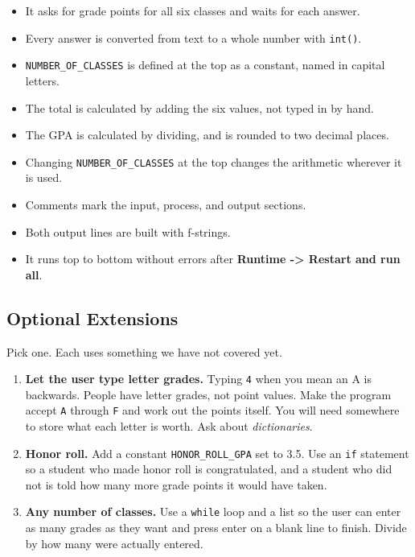 \documentclass[11pt]{article}
\begin{document}
\begin{itemize}
\item[{$\square$}] It asks for grade points for all six classes and waits for each answer.\\
\item[{$\square$}] Every answer is converted from text to a whole number with \texttt{int()}.\\
\item[{$\square$}] \texttt{NUMBER\_OF\_CLASSES} is defined at the top as a constant, named in capital letters.\\
\item[{$\square$}] The total is calculated by adding the six values, not typed in by hand.\\
\item[{$\square$}] The GPA is calculated by dividing, and is rounded to two decimal places.\\
\item[{$\square$}] Changing \texttt{NUMBER\_OF\_CLASSES} at the top changes the arithmetic wherever it is used.\\
\item[{$\square$}] Comments mark the input, process, and output sections.\\
\item[{$\square$}] Both output lines are built with f-strings.\\
\item[{$\square$}] It runs top to bottom without errors after \textbf{Runtime -> Restart and run all}.\\
\end{itemize}
\subsection{Optional Extensions}
\label{sec:org04ab082}

Pick one. Each uses something we have not covered yet.\\

\begin{enumerate}
\item \textbf{Let the user type letter grades.} Typing \texttt{4} when you mean an A is backwards. People have letter grades, not point values. Make the program accept \texttt{A} through \texttt{F} and work out the points itself. You will need somewhere to store what each letter is worth. Ask about \emph{dictionaries}.\\
\item \textbf{Honor roll.} Add a constant \texttt{HONOR\_ROLL\_GPA} set to 3.5. Use an \texttt{if} statement so a student who made honor roll is congratulated, and a student who did not is told how many more grade points it would have taken.\\
\item \textbf{Any number of classes.} Use a \texttt{while} loop and a list so the user can enter as many grades as they want and press enter on a blank line to finish. Divide by how many were actually entered.\\
\end{enumerate}
\end{document}
